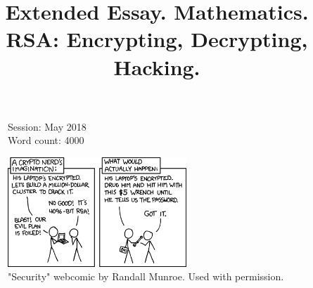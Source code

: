 \documentclass[a4paper, 12pt]{article}
\title{Extended Essay. Mathematics. \\ RSA: Encrypting, Decrypting, Hacking.}
\date{}
\begin{document}

\maketitle


\begin{flushleft}
\begin{figure}[b]
  Session: May 2018\\
  Word count: 4000\\
\end{figure}
\end{flushleft}

\newpage


\tableofcontents
\newpage
\listoffigures
\listoftables
\lstlistoflistings

\newpage
{}

\begin{figure}[h!]
  \begin{center}
    \includegraphics[width=0.6\textwidth]{xkcd_security.png}
    \caption{"Security" webcomic by Randall Munroe. Used with permission.\cite{xkcd}}
    \label{fig:xkcd}
    \end{center}
  \end{figure}
\end{document}
